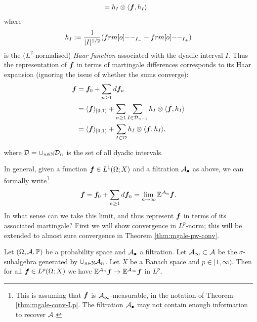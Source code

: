\begin{example}
\begin{equation*}
\begin{aligned}
      &= h_I \otimes \langle \bm{f}, h_I \rangle
    \end{aligned}
  \end{equation*}
  where
  \begin{equation*}
    h_I := \frac{1}{|I|^{1/2}} (\1_{I_-} - \1_{I_+})
  \end{equation*}
  is the ($L^2$-normalised) \emph{Haar function} associated with the dyadic interval $I$.
  Thus the representation of $\bm{f}$ in terms of martingale differences corresponds to its Haar expansion (ignoring the issue of whether the sums converge):
  \begin{equation*}
    \begin{aligned}
      \bm{f} &= \bm{f}_0 + \sum_{n \geq 1} d\bm{f}_{n} \\
      &= \langle \bm{f} \rangle_{[0,1)} + \sum_{n \geq 1} \sum_{I \in \mathcal{D}_{n-1}} h_I \otimes \langle \bm{f}, h_I \rangle \\
     &= \langle \bm{f} \rangle_{[0,1)} + \sum_{I \in \mathcal{D}}h_I \otimes \langle \bm{f}, h_I \rangle,
   \end{aligned}
  \end{equation*}
\end{example}
where $\mathcal{D} = \cup_{n \in \mathbb{N}} \mathcal{D}_{n}$ is the set of all dyadic intervals.

In general, given a function $\bm{f} \in L^1(\Omega;X)$ and a filtration $\mathcal{A}_{\bullet}$ as above, we can formally write\footnote{This is assuming that $\bm{f}$ is $\mathcal{A}_{\infty}$-measurable, in the notation of Theorem \ref{thm:mgale-conv-Lp}. The filtration $\mathcal{A}_{\bullet}$ may not contain enough information to recover $\mathcal{A}$.}
\begin{equation*}
  \bm{f} = \bm{f}_{0} + \sum_{n \geq 1} d\bm{f}_{n} = \lim_{n \to \infty} \mathbb{E}^{\mathcal{A}_{n}} \bm{f}.
\end{equation*}
In what sense can we take this limit, and thus represent $\bm{f}$ in terms of its associated martingale?
First we will show convergence in $L^p$-norm; this will be extended to almost sure convergence in Theorem \ref{thm:mgale-pw-conv}. 

\begin{thm}\label{thm:mgale-conv-Lp}
  Let $(\Omega, \mathcal{A}, \mathbb{P})$ be a probability space and $\mathcal{A}_{\bullet}$ a filtration.
  Let $\mathcal{A}_{\infty} \subset \mathcal{A}$ be the $\sigma$-subalgebra generated by $\cup_{n \in \mathbb{N}} \mathcal{A}_{n}$.
  Let $X$ be a Banach space and $p \in [1,\infty)$.
  Then for all $\bm{f} \in L^p(\Omega;X)$ we have $\mathbb{E}^{\mathcal{A}_{n}} \bm{f} \to \mathbb{E}^{\mathcal{A}_\infty} \bm{f}$ in $L^p$.
\end{thm}

